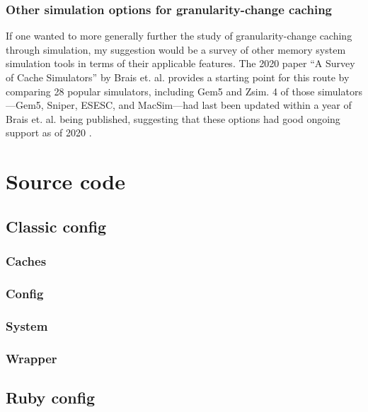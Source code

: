 \documentclass[12pt,twoside]{reedthesis}
\newcommand{\vstep}{\vspace{5mm}}
\begin{document}
	\subsection*{Other simulation options for granularity-change caching}

	If one wanted to more generally further the study of granularity-change caching through simulation, my suggestion would be a survey of other memory system simulation tools in terms of their applicable features. The 2020 paper ``A Survey of Cache Simulators'' by Brais et. al. provides a starting point for this route by comparing 28 popular simulators, including Gem5 and Zsim. 4 of those simulators---Gem5, Sniper, ESESC, and MacSim---had last been updated within a year of Brais et. al. being published, suggesting that these options had good ongoing support as of 2020 \cite{brais}.

	
\appendix

\chapter{Source code}

\section{Classic config}

\subsection*{Caches}

\vstep

\subsection*{Config}

\vstep

\subsection*{System}

\vstep

\subsection*{Wrapper}

\vstep

\section{Ruby config}
\end{document}
